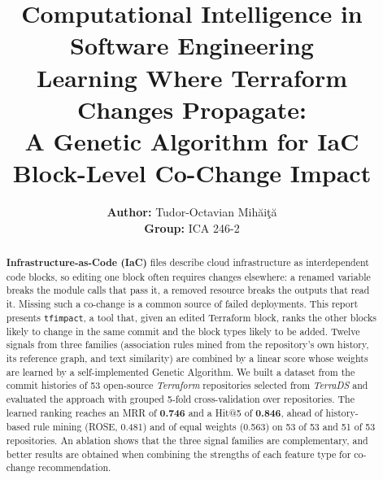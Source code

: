 \documentclass[a4paper, 11pt]{article}
\title{
    {\huge \textbf{Computational Intelligence in Software Engineering}} \\[1.5ex]
    {\Large \textbf{Learning Where Terraform Changes Propagate: \\ A Genetic Algorithm for IaC Block-Level Co-Change Impact}}
}
\author{\textbf{Author:} Tudor-Octavian Mih\u{a}i\c{t}\u{a}\\ \textbf{Group:} ICA 246-2}
\newcommand{\tool}{\texttt{tfimpact}}
\begin{document}
\maketitle

\begin{abstract}
\textbf{Infrastructure-as-Code (IaC)} files describe cloud infrastructure as interdependent code blocks, so
editing one block often requires changes elsewhere: a renamed variable breaks the module calls that
pass it, a removed resource breaks the outputs that read it. Missing such a co-change is a common
source of failed deployments. This report presents \tool, a tool that, given an edited Terraform
block, ranks the other blocks likely to change in the same commit and the block types likely to be
added. Twelve signals from three families (association rules mined from the repository's own
history, its reference graph, and text similarity) are combined by a linear score whose weights are
learned by a self-implemented Genetic Algorithm. We built a dataset from the commit histories of
53 open-source \emph{Terraform} repositories selected from \emph{TerraDS} and evaluated the approach with grouped
5-fold cross-validation over repositories. The learned ranking reaches an MRR of \textbf{0.746} and a Hit@5 of
\textbf{0.846}, ahead of history-based rule mining (ROSE, 0.481) and of equal weights (0.563) on 53 of 53 and
51 of 53 repositories. An ablation shows that the three signal families are complementary, and better results are obtained when combining the strengths of each feature type for co-change recommendation.
\end{abstract}





% 
% 
% 
% 
% 
% 



\end{document}
